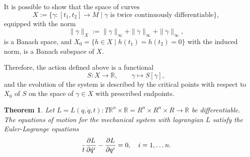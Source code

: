 \documentclass[english,fontsize=11pt,paper=a5,oneside]{scrbook}
\newcommand{\R}{\mathbb{R}}
\let\d\relax
\DeclareMathOperator{\d}{d}
\newtheorem{theorem}{Theorem}[chapter]
\theoremstyle{definition}
\begin{document}
It is possible to show that the space of curves 
\begin{equation}
    X := \big\{ \gamma: [t_1, t_2] \to M \mid \gamma \mbox{ is twice continuously differentiable}\big\},
\end{equation} equipped with the norm
\begin{equation}
    \|\gamma\|_X :=
    \|\gamma\|_\infty + \|\dot \gamma\|_\infty + \|\ddot \gamma\|_\infty,
\end{equation}
is a Banach space, and $X_0 = \big\{h\in X \mid h(t_1) = h(t_2) = 0\big\}$ with the induced norm, is a Banach subspace of $X$. 

Therefore, the action defined above is a functional
\begin{equation}
    S : X \to \R,\qquad \gamma \mapsto S[\gamma],
\end{equation}
and the evolution of the system is described by the critical points with respect to $X_0$ of $S$ on the space of $\gamma \in X$ with prescribed endpoints.

\begin{theorem}
    Let $L = L(q, \dot q, t) : T\R^{n}\times\R = R^{n}\times R^{n}\times R \to \R$ be differentiable.
    The equations of motion for the mechanical system with lagrangian $L$ satisfy the \emph{Euler-Lagrange equations}
    \begin{equation}\label{eq:eulerlagrange}
        \frac{\d}{\d t}\frac{\partial L}{\partial \dot q^i} - \frac{\partial L}{\partial q^i} = 0, \quad i=1,\ldots n.
    \end{equation}
\end{theorem}
\end{document}
